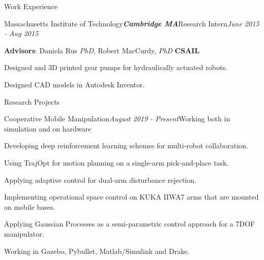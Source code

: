 \documentclass{resume} %
\begin{document}
\begin{rSection}{Work Experience}
\begin{rSubsection}{Massachusetts Institute of Technology}{\bf \em Cambridge MA}{Research Intern}{\em June 2015 - Aug 2015}
\item {\bf Advisors}: Daniela Rus {\em PhD},   Robert MacCurdy, {\em PhD} \hfill {\bf CSAIL}
\item Designed and 3D printed gear pumps for hydraulically actuated robots.
\item Designed CAD models in Autodesk Inventor.
\end{rSubsection}

\end{rSection}


\begin{rSection}{Research Projects}

\begin{rSubsection}{Cooperative Mobile Manipulation}{\em August 2019 - Present}{Working both in simulation and on hardware}{}
\item Developing deep reinforcement learning schemes for multi-robot collaboration.
\item Using TrajOpt for motion planning on a single-arm pick-and-place task.
\item Applying adaptive control for dual-arm disturbance rejection.
\item Implementing operational space control on KUKA IIWA7 arms that are mounted on mobile bases.
\item Applying Gaussian Processes as a semi-parametric control approach for a 7DOF manipulator.
\item Working in Gazebo, Pybullet, Matlab/Simulink and Drake.
\end{rSubsection}

\end{rSection}
\end{document}
